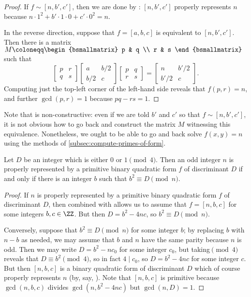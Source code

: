 \documentclass[../notes.tex]{subfiles}
\begin{document}
\begin{proof}
	If $f\sim[n,b',c']$, then we are done by : $[n,b',c']$ properly represents $n$ because $n\cdot1^2+b'\cdot1\cdot0+c'\cdot0^2=n$.

	In the reverse direction, suppose that $f=[a,b,c]$ is equivalent to $[n,b',c']$. Then there is a matrix $M\coloneqq\begin{bsmallmatrix}
		p & q \\ r & s
	\end{bsmallmatrix}$ such that
	\[\begin{bmatrix}
		p & r \\
		q & s
	\end{bmatrix}\begin{bmatrix}
		a & b/2 \\
		b/2 & c
	\end{bmatrix}\begin{bmatrix}
		p & q \\
		r & s
	\end{bmatrix}=\begin{bmatrix}
		n & b'/2 \\
		b'/2 & c
	\end{bmatrix}.\]
	Computing just the top-left corner of the left-hand side reveals that $f(p,r)=n$, and further $\gcd(p,r)=1$ because $pq-rs=1$.
\end{proof}
\begin{remark}
	Note that  is non-constructive: even if we are told $b'$ and $c'$ so that $f\sim[n,b',c']$, it is not obvious how to go back and construct the matrix $M$ witnessing this equivalence. Nonetheless, we ought to be able to go and back solve $f(x,y)=n$ using the methods of \cref{subsec:compute-primes-of-form}.
\end{remark}
\begin{corollary} \label{cor:some-form-by-qr}
	Let $D$ be an integer which is either $0$ or $1\pmod4$. Then an odd integer $n$ is properly represented by a primitive binary quadratic form $f$ of discriminant $D$ if and only if there is an integer $b$ such that $b^2\equiv D\pmod n$.
\end{corollary}
\begin{proof}
	If $n$ is properly represented by a primitive binary quadratic form $f$ of discriminant $D$, then  combined with  allows us to assume that $f=[n,b,c]$ for some integers $b,c\in\ZZ$. But then $D=b^2-4nc$, so $b^2\equiv D\pmod n$.

	Conversely, suppose that $b^2\equiv D\pmod n$ for some integer $b$; by replacing $b$ with $n-b$ as needed, we may assume that $b$ and $n$ have the same parity because $n$ is odd. Then we may write $D=b^2-nc_0$ for some integer $c_0$, but taking$\pmod4$ reveals that $D\equiv b^2\pmod4$, so in fact $4\mid c_0$, so $D=b^2-4nc$ for some integer $c$. But then $[n,b,c]$ is a binary quadratic form of discriminant $D$ which of course properly represents $n$ (by, say, ). Note that $[n,b,c]$ is primitive because $\gcd(n,b,c)$ divides $\gcd\left(n,b^2-4nc\right)$ but $\gcd(n,D)=1$.
\end{proof}
\end{document}
